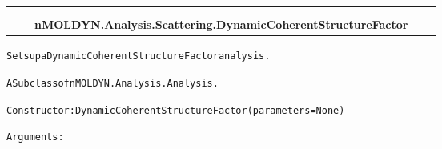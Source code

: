     \label{nMOLDYN:Analysis:Scattering:DynamicCoherentStructureFactor}
\begin{tabular}{cccccc}
\multicolumn{2}{r}{\settowidth{\BCL}{nMOLDYN.Analysis.Analysis.Analysis}\multirow{2}{\BCL}{nMOLDYN.Analysis.Analysis.Analysis}}
&&
  \\\cline{3-3}
  &&\multicolumn{1}{c|}{}
&&
  \\
&&\multicolumn{2}{l}{\textbf{nMOLDYN.Analysis.Scattering.DynamicCoherentStructureFactor}}
\end{tabular}

\begin{alltt}
Sets up a Dynamic Coherent Structure Factor analysis.

A Subclass of nMOLDYN.Analysis.Analysis. 

Constructor: DynamicCoherentStructureFactor({\textbar}parameters{\textbar} = None)

Arguments:


\end{alltt}

